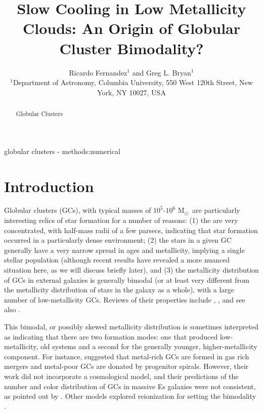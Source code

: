 \documentclass[useAMS,usenatbib]{mn2e}
\title{Slow Cooling in Low Metallicity Clouds: An Origin of Globular Cluster Bimodality?}
\author[R. Fernandez et al.]{Ricardo Fernandez$^{1}$ and Greg L. Bryan$^{1}$\\
$^{1}$Department of Astronomy, Columbia University, 550 West 120th Street, New York, NY 10027, USA}
\newcommand{\msun}{{M$_\odot$}}
\begin{document}
\date{}


\maketitle


\begin{abstract}
Globular Clusters
\end{abstract}

\begin{keywords}
globular clusters - methods:numerical
\end{keywords}

%
\section{Introduction}

Globular clusters (GCs), with typical masses of $10^5$-$10^6$ \msun\ are particularly interesting relics of star formation for a number of reasons: (1) the are very concentrated, with half-mass radii of a few parsecs, indicating that star formation occurred in a particularly dense environment; (2) the stars in a given GC generally have a very narrow spread in ages and metallicity, implying a single stellar population (although recent results have revealed a more nuanced situation here, as we will discuss briefly later), and (3) the metallicity distribution of GCs in external galaxies is generally bimodal (or at least very different from the metallicity distribution of stars in the galaxy as a whole), with a large number of low-metallicity GCs.  Reviews of their properties include \citet{Brodie2006}, \citet{Renzini2008, Renzini2013}, and see also \cite{zwart2010}.

This bimodal, or possibly skewed metallicity distribution \citep[e.g.,][]{Strader2003, Peng2006} is sometimes interpreted as indicating that there are two formation modes: one that produced low-metallicity, old systems and a second for the generally younger, higher-metallicity component.  For instance, \citet{Ashman1992} suggested that metal-rich GCs are formed in gas rich mergers and metal-poor GCs are donated by progenitor spirals.  However, their work did not incorporate a cosmological model, and their predictions of the number and color distribution of GCs in massive Es galaxies were not consistent, as pointed out by \citet{Forbes1997}.  Other models explored reionization for setting the bimodality \citep[e.g.,][]{Santos2003, Harris1994}.
\end{document}
